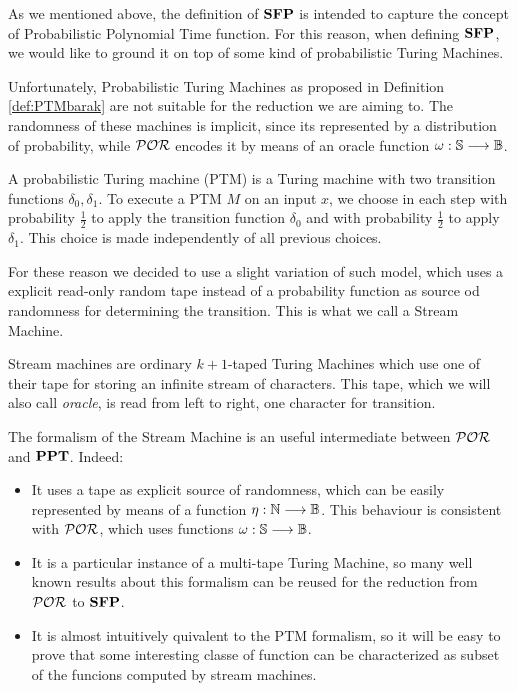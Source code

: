 \begin{conditional}{\notappendix}

  As we mentioned above, the definition of $\mathbf{SFP}$ is intended to capture the concept
  of Probabilistic Polynomial Time function. For this reason, when defining
  $\mathbf{SFP}$, we would like to ground it on top of some kind of probabilistic Turing Machines.

  Unfortunately, Probabilistic Turing Machines
  as proposed in Definition \ref{def:PTMbarak} are not
  suitable for the reduction we are aiming to. The randomness of these machines
  is implicit, since its represented by a distribution of probability,
  while $\mathcal{POR}$ encodes it by means of an oracle function
  $\omega : \mathbb{S} \longrightarrow \mathbb{B}$.

  \begin{defn}
    \label{def:PTMbarak}
    A probabilistic Turing machine (PTM) is a Turing machine with two
    transition functions $\delta_0, \delta_1$. To execute a PTM $M$
    on an input $x$, we choose in each step with probability $\frac 1 2$
    to apply the transition function $\delta_0$ and with probability $\frac 1 2$
    to apply $\delta_1$. This choice is made independently of all previous choices.
  \end{defn}

  For these reason we decided to use a slight variation of such model, which
  uses a explicit read-only random tape instead of a probability function as
  source od randomness for determining the transition.
  This is what we call a Stream Machine.

  \begin{defn}
  Stream machines are ordinary $k+1$-taped Turing Machines which use one of
  their tape for storing an infinite stream of characters. This tape, which we will
  also call \emph{oracle}, is read from left to right, one character for transition.
  \end{defn}


  The formalism of the Stream Machine is an useful intermediate between $\mathcal{POR}$
  and $\mathbf{PPT}$. Indeed:
  \begin{itemize}
    \item It uses a tape as explicit source of randomness, which can
    be easily represented by means of a function $\eta: \mathbb{N} \longrightarrow \mathbb{B}$.
    This behaviour is consistent with $\mathcal{POR}$, which uses functions
    $\omega: \mathbb{S} \longrightarrow \mathbb{B}$.
    \item It is a particular instance of a multi-tape Turing Machine, so many well
    known results about this formalism can be reused for the reduction from
    $\mathcal{POR}$ to $\mathbf{SFP}$.
    \item It is almost intuitively quivalent to the PTM formalism, so it will
    be easy to prove that some interesting classe of function can be characterized
    as subset of the funcions computed by stream machines.
  \end{itemize}


\end{conditional}
